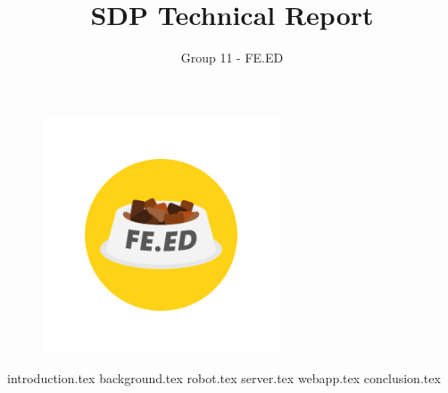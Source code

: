 \documentclass{article}
\begin{document}
\renewcommand*{\contentsname}{\color{DarkBlue}\Huge Contents}

\title{\color{DarkBlue}\Huge SDP Technical Report}
\author{\color{MediumBlue}\Large Group 11 - FE.ED}
\date{}

\begin{titlepage}
\maketitle
\begin{figure}[h]
    \centering
    \includegraphics[width = 7cm]{feed_logo.png}
\end{figure}


\end{titlepage}


\tableofcontents
\pagebreak


{introduction.tex}
{background.tex}
{robot.tex}
{server.tex}
{webapp.tex}
{conclusion.tex}
\end{document}
